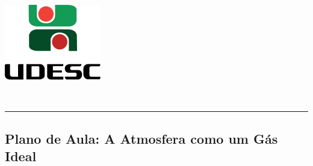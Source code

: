 \thispagestyle{empty}
\begin{center}
	\begin{minipage}[!]{\linewidth}
		\begin{minipage}[!]{.19\linewidth}
			\includegraphics[width=\linewidth]{assets/logo.png}
		\end{minipage}
		\begin{minipage}[!]{.8\linewidth}
			\center
			\ABNTEXchapterfont\normalsize\MakeUppercase{\imprimirinstituicao}
			\par
			\vspace*{10pt}                     
			\ABNTEXchapterfont\normalsize\MakeUppercase{\centro}
			\par
			\vspace*{10pt}           
			\ABNTEXchapterfont\normalsize\MakeUppercase{\disciplina}
		\end{minipage}        
	\end{minipage}
	\\ \vspace{0.5cm}
	\rule{\textwidth}{.5pt}   
\end{center}
\textual
\begin{center}
	\section{Plano de Aula: A Atmosfera como um Gás Ideal} %
	\label{sec:Plano de Aula: A Atmosfera como um Gás Ideal}
	
\end{center}
